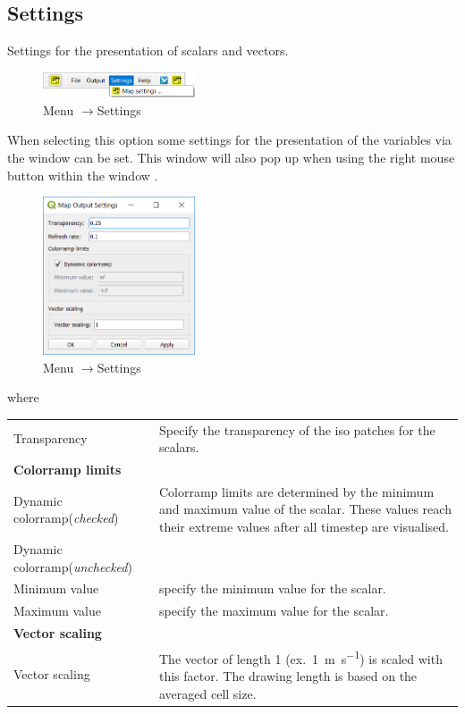 \documentclass{deltares_memo}
\newcommand{\menuarrow}{$\rightarrow$}
\begin{document}
\subsection{Settings}
Settings for the presentation of scalars and vectors.
\begin{figure}[H]
    \centering    
    \includegraphics[width=0.40\textwidth]{pictures/menu_settings.png}
    \caption{Menu \menuarrow Settings}
\end{figure}
When selecting this option some settings for the presentation of the variables via the window  can be set. 
This window will also pop up when using the right mouse button within the window .
\begin{figure}[H]
	\centering    
	\includegraphics[width=0.40\textwidth]{pictures/map_properties.png}
	\caption{Menu \menuarrow Settings}
\end{figure}
where
\begin{longtable}{p{35mm-12pt} p{\textwidth-35mm-12pt}} 
	Transparency & Specify the transparency of the iso patches for the scalars. \\
	\textbf{Colorramp limits} & \\
	Dynamic colorramp\newline (\textit{checked}) & Colorramp limits are determined by the minimum and maximum value of the scalar. 
	These values reach their extreme values after all timestep are visualised.\\
	Dynamic colorramp\newline (\textit{unchecked}) & \\
	Minimum value & specify the minimum value for the scalar.\\
	Maximum value & specify the maximum value for the scalar.\\
	\textbf{Vector scaling} & \\
	Vector scaling & The vector of length 1 (ex.\ \SI{1}{\metre\per\second}) is scaled with this factor. The drawing length is based on the averaged cell size.
\end{longtable}
\end{document}
